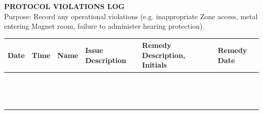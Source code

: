 \documentclass[11pt, letterpaper]{article}
\begin{document}
\begin{center}
    {\Large \textbf{PROTOCOL VIOLATIONS LOG}}\\
    \vspace{5pt}
    Purpose: Record any operational violations (e.g. inappropriate Zone access, metal entering Magnet room, failure to administer hearing protection).
\end{center}

\vspace{15pt}

\noindent
\begin{tabularx}{\textwidth}{
    | >{\centering\arraybackslash}m{2cm} |
    >{\centering\arraybackslash}m{1.8cm} |
    >{\centering\arraybackslash}m{2cm} |
    >{\centering\arraybackslash}X |
    >{\centering\arraybackslash}m{7cm} |
    >{\centering\arraybackslash}m{2cm} |}
    \hline
    \rowcolor{lightgray}
    \textbf{Date} & \textbf{Time} & \textbf{Name} & \textbf{Issue Description} & \textbf{Remedy Description, Initials} & \textbf{Remedy Date} \\ \hline
    & & & & & \\[3.5ex] \hline
    & & & & & \\[3.5ex] \hline
    & & & & & \\[3.5ex] \hline
    & & & & & \\[3.5ex] \hline
    & & & & & \\[3.5ex] \hline
    & & & & & \\[3.5ex] \hline
    & & & & & \\[3.5ex] \hline
    & & & & & \\[3.5ex] \hline
    & & & & & \\[3.5ex] \hline
    & & & & & \\[3.5ex] \hline
    & & & & & \\[3.5ex] \hline
    & & & & & \\[3.5ex] \hline
    & & & & & \\[3.5ex] \hline
    & & & & & \\[3.5ex] \hline
\end{tabularx}
\end{document}
